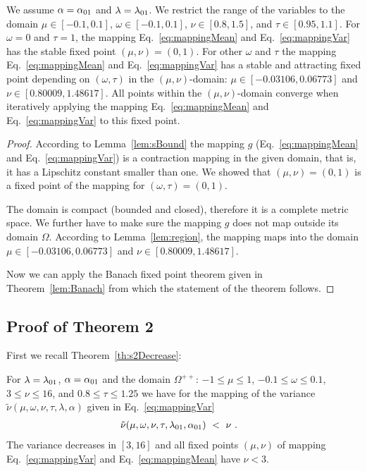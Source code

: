 \documentclass{article}
\newcommand\nunn{{\tilde \nu}}
\renewcommand{\leq}{\leqslant}
\begin{document}
\begin{theorem*}
We assume $\alpha = \alpha_{\rm 01}$ and $\lambda=\lambda_{\rm 01}$.
We restrict the range of the variables to the domain
$\mu \in [-0.1,0.1]$,
$\omega \in [-0.1,0.1]$,
$\nu \in [0.8,1.5]$, and
$\tau \in [0.95,1.1]$.
For $\omega=0$ and $\tau=1$, the mapping  Eq.~\eqref{eq:mappingMean}
and Eq.~\eqref{eq:mappingVar} has the stable
fixed point $(\mu,\nu)=(0,1)$.
For other $\omega$ and $\tau$ the mapping  Eq.~\eqref{eq:mappingMean}
and Eq.~\eqref{eq:mappingVar}  has a stable and
attracting fixed point depending on $(\omega,\tau)$ in the 
$(\mu,\nu)$-domain: $\mu \in [-0.03106, 0.06773]$ and 
$\nu \in [0.80009,1.48617]$.
All points within the $(\mu,\nu)$-domain converge when
iteratively applying the mapping  Eq.~\eqref{eq:mappingMean}
and Eq.~\eqref{eq:mappingVar} to this fixed point.
\end{theorem*}


\begin{proof} 
According to Lemma~\ref{lem:sBound} the mapping $g$ (Eq.~\eqref{eq:mappingMean} and Eq.~\eqref{eq:mappingVar})
is a contraction mapping in the given
domain, that is, it has a Lipschitz constant smaller than one.
We showed that $(\mu,\nu)=(0,1)$ is a fixed point of the
mapping for $(\omega,\tau)=(0,1)$. 

The domain is compact (bounded and closed), therefore it is a  
complete metric space.
We further have to make sure the  mapping $g$ does not map outside its domain $\Omega$.
According to Lemma~\ref{lem:region}, the mapping maps into the domain $\mu \in [-0.03106, 0.06773]$ and 
$\nu \in [0.80009,1.48617]$. 

Now we can apply the Banach fixed point theorem 
given in Theorem~\ref{lem:Banach} from which the statement of the 
theorem follows.
\end{proof}

\subsection{Proof of Theorem 2} 

First we recall Theorem~\ref{th:s2Decrease}:
\begin{theorem*}[Decreasing $\nu$]
For $\lambda=\lambda_{\rm 01}$, $\alpha=\alpha_{\rm 01}$ 
and the domain $\Omega^{++}$:
$-1 \leq \mu \leq 1$, 
$-0.1 \leq \omega \leq 0.1$,
$3 \leq \nu \leq 16$, and 
$0.8 \leq \tau \leq 1.25$ we have for 
the mapping of the variance
$\nunn(\mu,\omega,\nu,\tau,\lambda, \alpha )$  given in Eq.~\eqref{eq:mappingVar}
\begin{align}
\nunn(\mu,\omega,\nu,\tau,\lambda_{\rm 01},\alpha_{\rm 01}) \ &< \ \nu \ .
\end{align}
The variance decreases in $[3,16]$ and all fixed
points $(\mu,\nu)$ of mapping Eq.~\eqref{eq:mappingVar} and Eq.~\eqref{eq:mappingMean} have $\nu<3$.
\end{theorem*}
\end{document}
